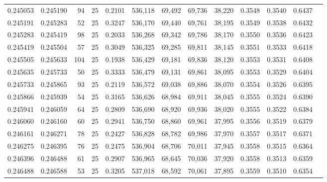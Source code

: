 \begin{tabular}{rrrrrrrrrrrrr}
0.245053 & 0.245190 &    94 &  25 &                                     0.2101 & 536,118 &  69,492 &  69,736 &  38,220 & 0.3548 & 0.3540 & 0.6437 \\
0.245191 & 0.245283 &    52 &  25 &                                     0.3247 & 536,170 &  69,440 &  69,761 &  38,195 & 0.3549 & 0.3538 & 0.6432 \\
0.245283 & 0.245419 &    98 &  25 &                                     0.2033 & 536,268 &  69,342 &  69,786 &  38,170 & 0.3550 & 0.3536 & 0.6423 \\
0.245419 & 0.245504 &    57 &  25 &                                     0.3049 & 536,325 &  69,285 &  69,811 &  38,145 & 0.3551 & 0.3533 & 0.6418 \\
0.245505 & 0.245633 &   104 &  25 &                                     0.1938 & 536,429 &  69,181 &  69,836 &  38,120 & 0.3553 & 0.3531 & 0.6408 \\
0.245635 & 0.245733 &    50 &  25 &                                     0.3333 & 536,479 &  69,131 &  69,861 &  38,095 & 0.3553 & 0.3529 & 0.6404 \\
0.245733 & 0.245865 &    93 &  25 &                                     0.2119 & 536,572 &  69,038 &  69,886 &  38,070 & 0.3554 & 0.3526 & 0.6395 \\
0.245866 & 0.245939 &    54 &  25 &                                     0.3165 & 536,626 &  68,984 &  69,911 &  38,045 & 0.3555 & 0.3524 & 0.6390 \\
0.245941 & 0.246059 &    64 &  25 &                                     0.2809 & 536,690 &  68,920 &  69,936 &  38,020 & 0.3555 & 0.3522 & 0.6384 \\
0.246060 & 0.246160 &    60 &  25 &                                     0.2941 & 536,750 &  68,860 &  69,961 &  37,995 & 0.3556 & 0.3519 & 0.6379 \\
0.246161 & 0.246271 &    78 &  25 &                                     0.2427 & 536,828 &  68,782 &  69,986 &  37,970 & 0.3557 & 0.3517 & 0.6371 \\
0.246275 & 0.246395 &    76 &  25 &                                     0.2475 & 536,904 &  68,706 &  70,011 &  37,945 & 0.3558 & 0.3515 & 0.6364 \\
0.246396 & 0.246488 &    61 &  25 &                                     0.2907 & 536,965 &  68,645 &  70,036 &  37,920 & 0.3558 & 0.3513 & 0.6359 \\
0.246488 & 0.246588 &    53 &  25 &                                     0.3205 & 537,018 &  68,592 &  70,061 &  37,895 & 0.3559 & 0.3510 & 0.6354 \\

\end{tabular}
